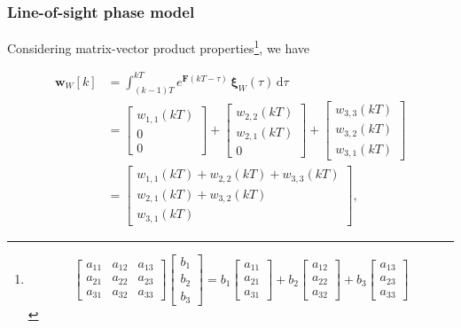 \documentclass[
    hyperref={colorlinks,citecolor=DeepPink4,linkcolor=DarkRed,urlcolor=DarkBlue}
]{beamer_class}
\begin{document}
\begin{frame}
    \frametitle{Line-of-sight phase model}

    Considering matrix-vector product properties\footnote{$$\begin{bmatrix}
        a_{11} & a_{12} & a_{13} \\
        a_{21} & a_{22} & a_{23} \\
        a_{31} & a_{32} & a_{33}
    \end{bmatrix} \begin{bmatrix}
        b_{1} \\
        b_{2} \\
        b_{3}
    \end{bmatrix} = b_{1} \begin{bmatrix}
        a_{11} \\
        a_{21} \\
        a_{31}
    \end{bmatrix} + b_{2} \begin{bmatrix}
        a_{12} \\
        a_{22} \\
        a_{32}
    \end{bmatrix} + b_{3} \begin{bmatrix}
        a_{13} \\
        a_{23} \\
        a_{33}
    \end{bmatrix}$$}, we have

    \begin{align}
        \mathbf{w}_{W}[k] &= \int_{(k-1)T}^{kT} e^{\mathbf{F}(kT-\tau)}\,\boldsymbol{\xi}_{W}(\tau)\,\mathrm{d}\tau \\
        &= \begin{bmatrix} w_{1,1}(kT) \\ 0 \\ 0 \end{bmatrix}
        +\begin{bmatrix} w_{2,2}(kT) \\ w_{2,1}(kT) \\ 0 \end{bmatrix}
        +\begin{bmatrix} w_{3,3}(kT) \\ w_{3,2}(kT) \\ w_{3,1}(kT) \end{bmatrix}\\
        &= \begin{bmatrix}
            w_{1,1}(kT)+w_{2,2}(kT)+w_{3,3}(kT)\\[4pt]
            w_{2,1}(kT)+w_{3,2}(kT)\\[4pt]
            w_{3,1}(kT)
        \end{bmatrix},
    \end{align}

\end{frame}
\end{document}
